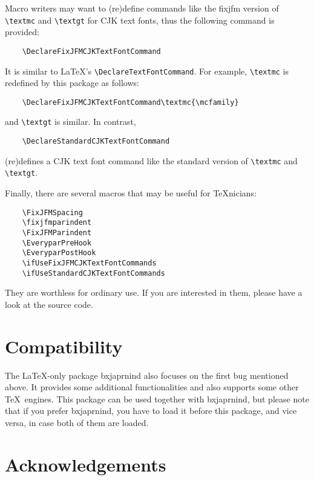\documentclass[a4paper]{article}
\newcommand\NormalSans{\normalfont\sffamily}
\newcommand\pkg[1]{{\protect\NormalSans#1}}
\begin{document}
Macro writers may want to (re)define commands like the \pkg{fixjfm} version of
\verb|\textmc| and \verb|\textgt| for CJK text fonts, thus the following command
is provided:
\begin{verbatim}
    \DeclareFixJFMCJKTextFontCommand
\end{verbatim}
It is similar to \LaTeX's \verb|\DeclareTextFontCommand|. For example,
\verb|\textmc| is redefined by this package as follows:
\begin{verbatim}
    \DeclareFixJFMCJKTextFontCommand\textmc{\mcfamily}
\end{verbatim}
and \verb|\textgt| is similar. In contrast,
\begin{verbatim}
    \DeclareStandardCJKTextFontCommand
\end{verbatim}
(re)defines a CJK text font command like the standard version of \verb|\textmc|
and \verb|\textgt|.

Finally, there are several macros that may be useful for \TeX nicians:
\begin{verbatim}
    \FixJFMSpacing
    \fixjfmparindent
    \FixJFMParindent
    \EveryparPreHook
    \EveryparPostHook
    \ifUseFixJFMCJKTextFontCommands
    \ifUseStandardCJKTextFontCommands
\end{verbatim}
They are worthless for ordinary use. If you are interested in them, please have
a look at the source code.

\section{Compatibility}

The \LaTeX-only package \pkg{bxjaprnind} also focuses on the first bug mentioned
above. It provides some additional functionalities and also supports some other
\TeX\ engines. This package can be used together with \pkg{bxjaprnind}, but
please note that if you prefer \pkg{bxjaprnind}, you have to load it before this
package, and vice versa, in case both of them are loaded.

\section{Acknowledgements}
\end{document}
